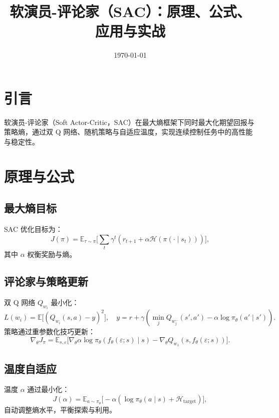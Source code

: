 \documentclass[UTF8,zihao=-4]{ctexart}
\title{软演员-评论家（SAC）：原理、公式、应用与实战}
\author{}
\date{\today}
\begin{document}
\maketitle

\section{引言}
软演员-评论家（Soft Actor-Critic，SAC）在最大熵框架下同时最大化期望回报与策略熵，通过双 Q 网络、随机策略与自适应温度，实现连续控制任务中的高性能与稳定性。

\section{原理与公式}
\subsection{最大熵目标}
SAC 优化目标为：
\begin{equation}
J(\pi) = \mathbb{E}_{\tau \sim \pi}\Big[ \sum_{t} \gamma^t (r_{t+1} + \alpha \mathcal{H}(\pi(\cdot\mid s_t))) \Big],
\end{equation}
其中 \(\alpha\) 权衡奖励与熵。

\subsection{评论家与策略更新}
双 Q 网络 \(Q_{w_i}\) 最小化：
\begin{equation}
L(w_i) = \mathbb{E}\Big[(Q_{w_i}(s,a) - y)^2\Big], \quad y = r + \gamma (\min_j Q_{w_j^-}(s', a') - \alpha \log \pi_\theta(a'\mid s')).
\end{equation}
策略通过重参数化技巧更新：
\begin{equation}
\nabla_\theta J_{\pi} = \mathbb{E}_{s,\varepsilon}\big[ \nabla_\theta \alpha \log \pi_\theta(f_\theta(\varepsilon; s)\mid s) - \nabla_\theta Q_{w_1}(s, f_\theta(\varepsilon; s)) \big].
\end{equation}

\subsection{温度自适应}
温度 \(\alpha\) 通过最小化：
\begin{equation}
J(\alpha) = \mathbb{E}_{a \sim \pi_\theta}\big[ -\alpha (\log \pi_\theta(a\mid s) + \mathcal{H}_{\text{target}}) \big],
\end{equation}
自动调整熵水平，平衡探索与利用。
\end{document}
